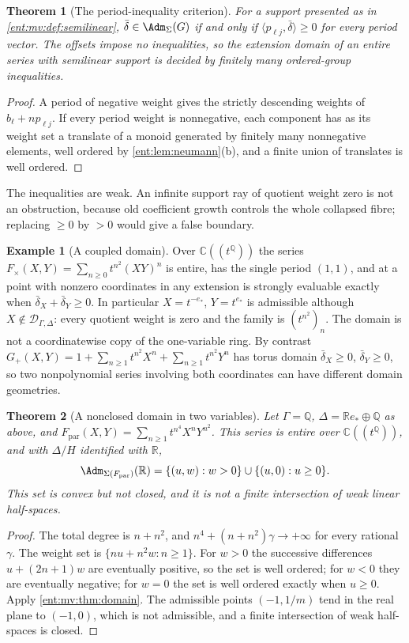 \documentclass[11pt]{article}
\newtheorem{theorem}{Theorem}[section]
\theoremstyle{plain}
\theoremstyle{plain}
\theoremstyle{plain}
\theoremstyle{definition}
\theoremstyle{definition}
\theoremstyle{definition}
\newtheorem{example}[example]{Example}
\theoremstyle{definition}
\theoremstyle{remark}
\newcommand{\C}{\mathbb C}\newcommand{\R}{\mathbb R}
\newcommand{\Q}{\mathbb Q}\newcommand{\Z}{\mathbb Z}\newcommand{\N}{\mathbb N}
\newcommand{\Dom}{\mathcal D_{\Gamma,\Delta}}
\newcommand{\inner}[2]{\langle#1,#2\rangle}
\begin{document}
\begin{theorem}[The period-inequality criterion]\label{ent:mv:thm:semilinear}
For a support presented as in \cref{ent:mv:def:semilinear},
$\bar\delta\in\Adm_\Sigma(G)$ if and only if $\inner{p_{\ell j}}{\bar\delta}
\ge0$ for every period vector. The offsets impose no inequalities, so the
extension domain of an entire series with semilinear support is decided by
finitely many ordered-group inequalities.
\end{theorem}
\begin{proof}
A period of negative weight gives the strictly descending weights of
$b_\ell+np_{\ell j}$. If every period weight is nonnegative, each component
has as its weight set a translate of a monoid generated by finitely many
nonnegative elements, well ordered by \cref{ent:lem:neumann}(b), and a finite
union of translates is well ordered.
\end{proof}

The inequalities are weak. An infinite support ray of quotient weight zero is
not an obstruction, because old coefficient growth controls the whole
collapsed fibre; replacing $\ge0$ by $>0$ would give a false boundary.

\begin{example}[A coupled domain]\label{ent:mv:ex:product}
Over $\C((t^\Q))$ the series $F_\times(X,Y)=\sum_{n\ge0}t^{n^2}(XY)^n$ is
entire, has the single period $(1,1)$, and at a point with nonzero
coordinates in any extension is strongly evaluable exactly when
$\bar\delta_X+\bar\delta_Y\ge0$. In particular $X=t^{-e_*}$, $Y=t^{e_*}$ is
admissible although $X\notin\Dom$: every quotient weight is zero and the
family is $(t^{n^2})_n$. The domain is not a coordinatewise copy of the
one-variable ring. By contrast
$G_+(X,Y)=1+\sum_{n\ge1}t^{n^2}X^n+\sum_{n\ge1}t^{n^2}Y^n$ has torus domain
$\bar\delta_X\ge0$, $\bar\delta_Y\ge0$, so two nonpolynomial series involving
both coordinates can have different domain geometries.
\end{example}

\begin{theorem}[A nonclosed domain in two variables]\label{ent:mv:thm:nonclosed}
Let $\Gamma=\Q$, $\Delta=\R e_*\oplus\Q$ as above, and
$F_{\mathrm{par}}(X,Y)=\sum_{n\ge1}t^{n^4}X^nY^{n^2}$. This series is entire
over $\C((t^\Q))$, and with $\Delta/H$ identified with $\R$,
\[
 \Adm_{\Sigma(F_{\mathrm{par}})}(\R)=\{(u,w):w>0\}\cup\{(u,0):u\ge0\}.
\]
This set is convex but not closed, and it is not a finite intersection of
weak linear half-spaces.
\end{theorem}
\begin{proof}
The total degree is $n+n^2$, and $n^4+(n+n^2)\gamma\to+\infty$ for every
rational $\gamma$. The weight set is $\{nu+n^2w:n\ge1\}$. For $w>0$ the
successive differences $u+(2n+1)w$ are eventually positive, so the set is
well ordered; for $w<0$ they are eventually negative; for $w=0$ the set is
well ordered exactly when $u\ge0$. Apply \cref{ent:mv:thm:domain}. The
admissible points $(-1,1/m)$ tend in the real plane to $(-1,0)$, which is not
admissible, and a finite intersection of weak half-spaces is closed.
\end{proof}
\end{document}
